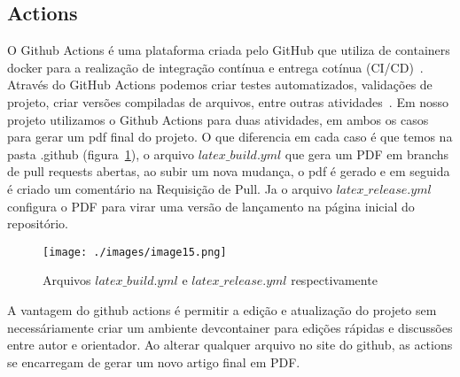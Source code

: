 \subsection{Actions}

O Github Actions é uma plataforma criada pelo GitHub que utiliza de containers docker para a realização de integração contínua e entrega cotínua (CI/CD)~\cite{github:02}. Através do GitHub Actions podemos criar testes automatizados, validações de projeto, criar versões compiladas de arquivos, entre outras atividades~\cite{github:02}. Em nosso projeto utilizamos o Github Actions para duas atividades, em ambos os casos para gerar um pdf final do projeto. O que diferencia em cada caso é que temos na pasta .github (figura~\ref{fig:image15}), o arquivo $latex\_build.yml$ que gera um PDF em branchs de pull requests abertas, ao subir um nova mudança, o pdf é gerado e em seguida é criado um comentário na Requisição de Pull. Ja o arquivo $latex\_release.yml$ configura o PDF para virar uma versão de lançamento na página inicial do repositório.

\begin{figure}[ht]
	\centering
	\texttt{[image: ./images/image15.png]}
	\caption{Arquivos $latex\_build.yml$ e $latex\_release.yml$ respectivamente}
	\label{fig:image15}
\end{figure}

A vantagem do github actions é permitir a edição e atualização do projeto sem necessáriamente criar um ambiente devcontainer para edições rápidas e discussões entre autor e orientador. Ao alterar qualquer arquivo no site do github, as actions se encarregam de gerar um novo artigo final em PDF.